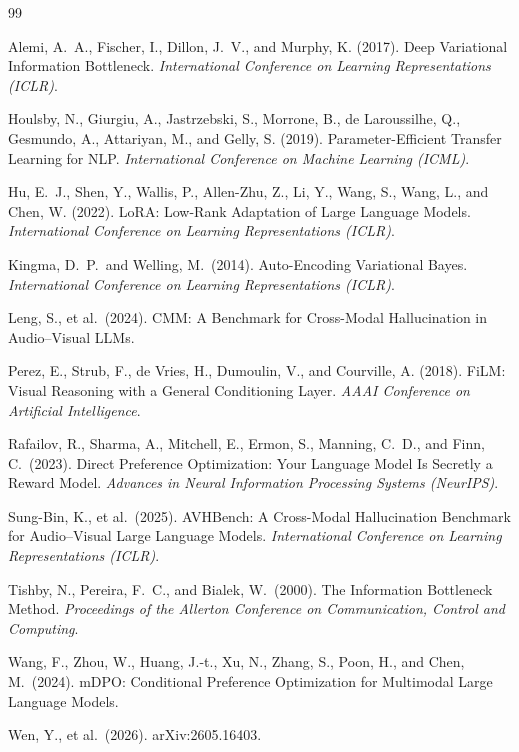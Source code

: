 \documentclass[11pt,a4paper,oneside]{article}
\begin{document}
\clearpage
\begin{thebibliography}{99}

 Alemi, A.~A., Fischer, I., Dillon, J.~V., and Murphy, K. (2017). Deep Variational
Information Bottleneck. \emph{International Conference on Learning Representations (ICLR)}.

 Houlsby, N., Giurgiu, A., Jastrzebski, S., Morrone, B., de Laroussilhe, Q.,
Gesmundo, A., Attariyan, M., and Gelly, S. (2019). Parameter-Efficient Transfer Learning for NLP.
\emph{International Conference on Machine Learning (ICML)}.

 Hu, E.~J., Shen, Y., Wallis, P., Allen-Zhu, Z., Li, Y., Wang, S., Wang, L., and Chen,
W. (2022). LoRA: Low-Rank Adaptation of Large Language Models. \emph{International Conference on
Learning Representations (ICLR)}.

 Kingma, D.~P.\ and Welling, M.\ (2014). Auto-Encoding Variational Bayes.
\emph{International Conference on Learning Representations (ICLR)}.

 Leng, S., et al.\ (2024). CMM: A Benchmark for Cross-Modal Hallucination in
Audio--Visual LLMs.

 Perez, E., Strub, F., de Vries, H., Dumoulin, V., and Courville, A. (2018). FiLM:
Visual Reasoning with a General Conditioning Layer. \emph{AAAI Conference on Artificial Intelligence}.

 Rafailov, R., Sharma, A., Mitchell, E., Ermon, S., Manning, C.~D., and Finn,
C.\ (2023). Direct Preference Optimization: Your Language Model Is Secretly a Reward Model.
\emph{Advances in Neural Information Processing Systems (NeurIPS)}.

 Sung-Bin, K., et al.\ (2025). AVHBench: A Cross-Modal Hallucination Benchmark
for Audio--Visual Large Language Models. \emph{International Conference on Learning Representations
(ICLR)}.

 Tishby, N., Pereira, F.~C., and Bialek, W.\ (2000). The Information Bottleneck
Method. \emph{Proceedings of the Allerton Conference on Communication, Control and Computing}.

 Wang, F., Zhou, W., Huang, J.-t., Xu, N., Zhang, S., Poon, H., and Chen, M.\
(2024). mDPO: Conditional Preference Optimization for Multimodal Large Language Models.

 Wen, Y., et al.\ (2026). arXiv:2605.16403.

\end{thebibliography}
\end{document}
